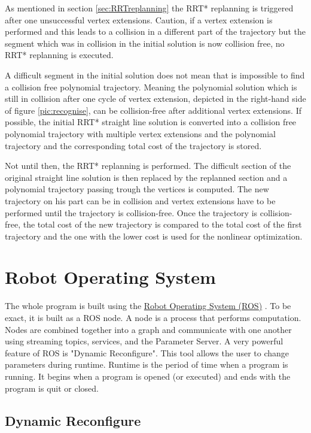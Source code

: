 As mentioned in section \ref{sec:RRTreplanning} the RRT* replanning is triggered after one unsuccessful vertex extensions. Caution, if a vertex extension is performed and this leads to a collision in a different part of the trajectory but the segment which was in collision in the initial solution is now collision free, no RRT* replanning is executed. \newline

A difficult segment in the initial solution does not mean that is impossible to find a collision free polynomial trajectory. Meaning the polynomial solution which is still in collision after one cycle of vertex extension, depicted in the right-hand side of figure \ref{pic:recognise}, can be collision-free after additional vertex extensions. If possible, the initial RRT* straight line solution is converted into a collision free polynomial trajectory with multiple vertex extensions and the polynomial trajectory and the corresponding total cost of the trajectory is stored. \newline

Not until then, the RRT* replanning is performed. The difficult section of the original straight line solution is then replaced by the replanned section and a polynomial trajectory passing trough the vertices is computed. The new trajectory on his part can be in collision and vertex extensions have to be performed until the trajectory is collision-free. Once the trajectory is collision-free, the total cost of the new trajectory is compared to the total cost of the first trajectory and the one with the lower cost is used for the nonlinear optimization.

\section{Robot Operating System}

The whole program is built using the \href{http://www.ros.org/}{Robot Operating System (ROS)} \cite{ROS}. To be exact, it is built as a ROS node. A node is a process that performs computation. Nodes are combined together into a graph and communicate with one another using streaming topics, services, and the Parameter Server. A very powerful feature of ROS is "Dynamic Reconfigure". This tool allows the user to change parameters during runtime. Runtime is the period of time when a program is running. It begins when a program is opened (or executed) and ends with the program is quit or closed.

\subsection{Dynamic Reconfigure}\label{sec:dynamicRec}

